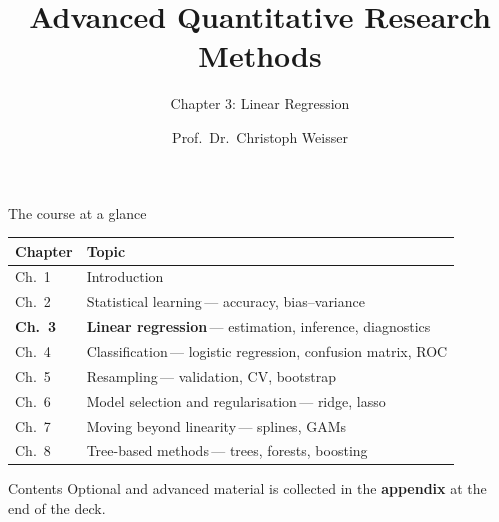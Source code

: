 \documentclass[aspectratio=169,11pt]{beamer}
\title{Advanced Quantitative Research Methods}
\subtitle{Chapter 3: Linear Regression}
\author{Prof.\ Dr.\ Christoph Weisser}
\date{}
\begin{document}
\begin{frame}[plain]
  \titlepage
\end{frame}

\begin{frame}{The course at a glance}
  \vspace{-1.5mm}
  \begin{center}
  \scriptsize
  \setlength{\tabcolsep}{5pt}
  \renewcommand{\arraystretch}{1.30}
  \begin{tabular}{@{\hspace{2pt}}l >{\raggedright\arraybackslash}p{}@{\hspace{2pt}}}
    \toprule
    \textbf{Chapter} & \textbf{Topic} \\
    \midrule
     {\color{accent}Ch.\ 1} & Introduction \\
    \rowcolor{black!3} {\color{accent}Ch.\ 2} & Statistical learning\,{\color{black!45}--- accuracy, bias--variance} \\
    \rowcolor{accent!18} \textbf{Ch.\ 3} & \textbf{Linear regression}\,{\color{accent!75!black}--- estimation, inference, diagnostics} \\
    \rowcolor{black!3} {\color{accent}Ch.\ 4} & Classification\,{\color{black!45}--- logistic regression, confusion matrix, ROC} \\
     {\color{accent}Ch.\ 5} & Resampling\,{\color{black!45}--- validation, CV, bootstrap} \\
    \rowcolor{black!3} {\color{accent}Ch.\ 6} & Model selection and regularisation\,{\color{black!45}--- ridge, lasso} \\
     {\color{accent}Ch.\ 7} & Moving beyond linearity\,{\color{black!45}--- splines, GAMs} \\
    \rowcolor{black!3} {\color{accent}Ch.\ 8} & Tree-based methods\,{\color{black!45}--- trees, forests, boosting} \\
    \bottomrule
  \end{tabular}
  \end{center}
\end{frame}



\begin{frame}{Contents}\footnotesize
  \tableofcontents[hideallsubsections]
  \vfill
  {\tiny Optional and advanced material is collected in the \textbf{appendix} at the end of the deck.}
\end{frame}
\end{document}
